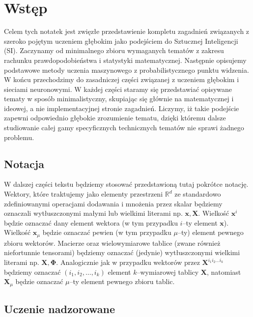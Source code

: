 \documentclass{myclass}
\numberwithin{equation}{subsection}
\begin{document}
{\footnotesize \tableofcontents}


\section{Wstęp}

Celem tych notatek jest zwięzłe przedstawienie kompletu zagadnień związanych z szeroko pojętym
uczeniem głębokim jako podejściem do Sztucznej Inteligencji (SI). Zaczynamy od minimalnego zbioru
wymaganych tematów z zakresu rachunku prawdopodobieństwa i statystyki matematycznej. Następnie
opisujemy podstawowe metody uczenia maszynowego z probabilistycznego punktu widzenia. W końcu
przechodzimy do zasadniczej części związanej z uczeniem głębokim i sieciami neuronowymi. W każdej
części staramy się przedstawiać opisywane tematy w sposób minimalistyczny, skupiając się głównie na
matematycznej i ideowej, a nie implementacyjnej stronie zagadnień. Liczymy, iż takie podejście
zapewni odpowiednio głębokie zrozumienie tematu, dzięki któremu dalsze studiowanie całej gamy
specyficznych technicznych tematów nie sprawi żadnego problemu.


\subsection{Notacja}

W dalszej części tekstu będziemy stosować przedstawioną tutaj pokrótce notację. Wektory, które
traktujemy jako elementy przestrzeni \(\mathbb{R}^d\) ze standardowo zdefiniowanymi operacjami
dodawania i mnożenia przez skalar będziemy oznaczali wytłuszczonymi małymi lub wielkimi literami np.
\(\bm{x}, \bm{X}\). Wielkość \(\bm{x}^i\) będzie oznaczać dany element wektora (w tym przypadku
\(i\)--ty element \(\bm{x}\)). Wielkość \(\bm{x}_\mu\) będzie oznaczać pewien (w tym przypadku
\(\mu\)--ty) element pewnego zbioru wektorów. Macierze oraz wielowymiarowe tablice (zwane również
niefortunnie tensorami) będziemy oznaczać (jedynie) wytłuszczonymi wielkimi literami np. \(\bm{X},
\bm{\Phi}\). Analogicznie jak w przypadku wektorów przez \(\bm{X}^{i_1 i_2 \ldots i_k}\) będziemy
oznaczać \((i_1,i_2,\ldots,i_k)\) element \(k\)--wymiarowej tablicy \(\bm{X}\), natomiast
\(\bm{X}_\mu\) będzie oznaczać \(\mu\)--ty element pewnego zbioru tablic.


\subsection{Uczenie nadzorowane}
\end{document}
